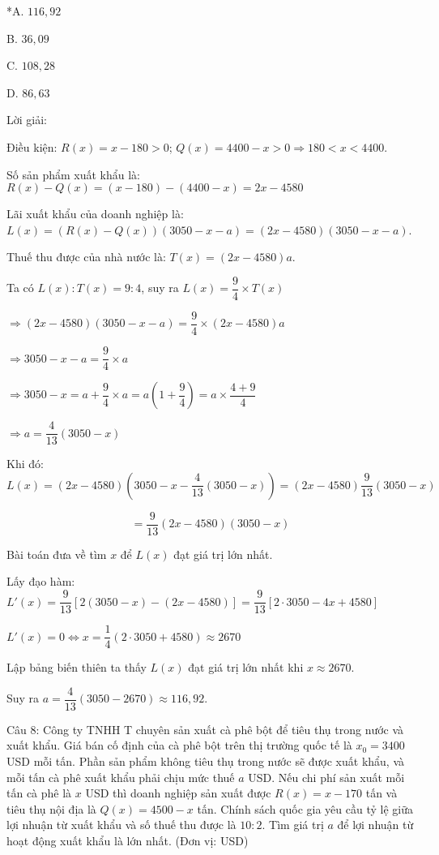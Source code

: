 \documentclass[a4paper,12pt]{article}
\begin{document}
*A. \(116,92\)

B. \(36,09\)

C. \(108,28\)

D. \(86,63\)

Lời giải:


Điều kiện: \(R(x) = x - 180 > 0\); \(Q(x) = 4400 - x > 0 \Rightarrow 180 < x < 4400\).

Số sản phẩm xuất khẩu là: \(R(x) - Q(x) = (x - 180) - (4400 - x) = 2x - 4580\)

Lãi xuất khẩu của doanh nghiệp là: \(L(x) = (R(x) - Q(x))(3050 - x - a) = (2x - 4580)(3050 - x - a)\).

Thuế thu được của nhà nước là: \(T(x) = (2x - 4580)a\).

Ta có \(L(x) : T(x) = 9 : 4\), suy ra \(L(x) = \dfrac{9}{4} \times T(x)\)

\(\Rightarrow (2x - 4580)(3050 - x - a) = \dfrac{9}{4} \times (2x - 4580)a\)

\(\Rightarrow 3050 - x - a = \dfrac{9}{4} \times a\)

\(\Rightarrow 3050 - x = a + \dfrac{9}{4} \times a = a\left(1 + \dfrac{9}{4}\right) = a \times \dfrac{4 + 9}{4}\)

\(\Rightarrow a = \dfrac{4}{13}(3050 - x)\)

Khi đó:
$$L(x) = (2x - 4580)\left(3050 - x - \dfrac{4}{13}(3050 - x)\right) = (2x - 4580) \dfrac{9}{13}(3050 - x)$$

$$= \dfrac{9}{13}(2x - 4580)(3050 - x)$$

Bài toán đưa về tìm \(x\) để \(L(x)\) đạt giá trị lớn nhất.

Lấy đạo hàm: \(L'(x) = \dfrac{9}{13}[2(3050 - x) - (2x - 4580)] = \dfrac{9}{13}[2 \cdot 3050 - 4x + 4580]\)

\(L'(x) = 0 \Leftrightarrow x = \dfrac{1}{4}(2 \cdot 3050 + 4580) \approx 2670\)

Lập bảng biến thiên ta thấy \(L(x)\) đạt giá trị lớn nhất khi \(x \approx 2670\).

Suy ra \(a = \dfrac{4}{13}(3050 - 2670) \approx 116,92\).




Câu 8: Công ty TNHH T chuyên sản xuất cà phê bột để tiêu thụ trong nước và xuất khẩu. Giá bán cố định của cà phê bột trên thị trường quốc tế là \(x_0 = 3400\) USD mỗi tấn. Phần sản phẩm không tiêu thụ trong nước sẽ được xuất khẩu, và mỗi tấn cà phê xuất khẩu phải chịu mức thuế \(a\) USD. Nếu chi phí sản xuất mỗi tấn cà phê là \(x\) USD thì doanh nghiệp sản xuất được \(R(x) = x - 170\) tấn và tiêu thụ nội địa là \(Q(x) = 4500 - x\) tấn. Chính sách quốc gia yêu cầu tỷ lệ giữa lợi nhuận từ xuất khẩu và số thuế thu được là \(10 : 2\). Tìm giá trị \(a\) để lợi nhuận từ hoạt động xuất khẩu là lớn nhất. (Đơn vị: USD)
\end{document}
